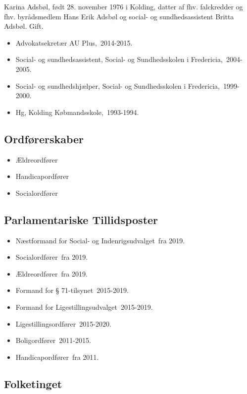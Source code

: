 \documentclass[11pt, a4paper]{awesome-cv}
\begin{document}
\makecvheader[R]
\makelettertitle
\begin{cvletter}
Karina Adsbøl, født 28. november 1976 i Kolding, datter af fhv. falckredder og fhv. byrådsmedlem Hans Erik Adsbøl og social- og sundhedsassistent Britta Adsbøl. Gift.

\begin{itemize}
\item Advokatsekretær AU Plus, 2014-2015.
\item Social- og sundhedsassistent, Social- og Sundhedsskolen i Fredericia, 2004-2005.
\item Social- og sundhedshjælper, Social- og Sundhedsskolen i Fredericia, 1999-2000.
\item Hg, Kolding Købmandsskole, 1993-1994.
\end{itemize}
\subsection*{Ordførerskaber}
\begin{itemize}
\item Ældreordfører
\item Handicapordfører
\item Socialordfører
\end{itemize}
\subsection*{Parlamentariske Tillidsposter}
\begin{itemize}
\item Næstformand for Social- og Indenrigsudvalget fra 2019.
\item Socialordfører fra 2019.
\item Ældreordfører fra 2019.
\item Formand for § 71-tilsynet 2015-2019.
\item Formand for Ligestillingsudvalget 2015-2019.
\item Ligestillingsordfører 2015-2020.
\item Boligordfører 2011-2015.
\item Handicapordfører fra 2011.
\end{itemize}
\subsection*{Folketinget}

\end{cvletter}
\end{document}
